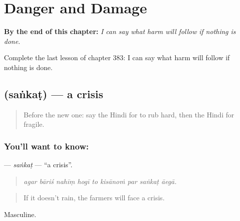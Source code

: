 
\chapter{Danger and Damage}
\label{ch:hi-danger-and-damage}

\begin{chapteropening}
\textbf{By the end of this chapter:} \emph{I can say what harm will follow if nothing is done.}

Complete the last lesson of chapter 383: I can say what harm will follow if nothing is done.
\end{chapteropening}

\section[\texorpdfstring{\hi{संकट} (saṅkaṭ)}{संकट (saṅkaṭ)}]{ (saṅkaṭ) — a crisis}

\label{lesson:HI-C383-sankat}



\begin{quote}
Before the new one: say the Hindi for to rub hard, then the Hindi for fragile.
\end{quote}

\subsection*{You'll want to know: }
\textbf{} — \emph{saṅkaṭ} — \textquotedblleft{}a crisis\textquotedblright{}.

\begin{quote}
        
\end{quote}

\begin{quote}
\emph{agar bāriś nahīṃ hogī to kisānoṁ par saṅkaṭ āegā.}
\end{quote}

\begin{quote}
If it doesn't rain, the farmers will face a crisis.
\end{quote}

Masculine.

